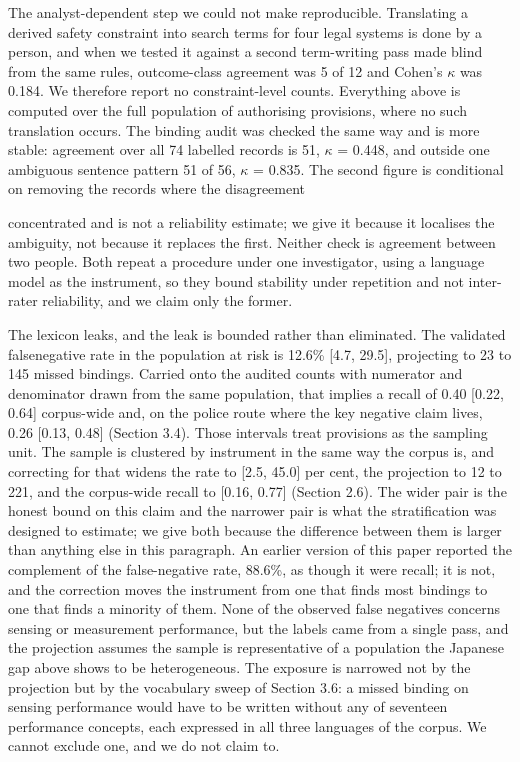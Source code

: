 The analyst-dependent step we could not make reproducible. Translating a derived safety constraint into search terms for four legal systems is done by a person, and when we tested it against a second term-writing pass made blind from the same rules, outcome-class agreement was 5 of 12 and Cohen's $\kappa$ was 0.184. We therefore report no constraint-level counts. Everything above is computed over the full population of authorising provisions, where no such translation occurs. The binding audit was checked the same way and is more stable: agreement over all 74 labelled records is 51, $\kappa$ = 0.448, and outside one ambiguous sentence pattern 51 of 56, $\kappa$ = 0.835. The second figure is conditional on removing the records where the disagreement

concentrated and is not a reliability estimate; we give it because it localises the ambiguity, not because it replaces the first. Neither check is agreement between two people. Both repeat a procedure under one investigator, using a language model as the instrument, so they bound stability under repetition and not inter-rater reliability, and we claim only the former.

The lexicon leaks, and the leak is bounded rather than eliminated. The validated falsenegative rate in the population at risk is 12.6\% [4.7, 29.5], projecting to 23 to 145 missed bindings. Carried onto the audited counts with numerator and denominator drawn from the same population, that implies a recall of 0.40 [0.22, 0.64] corpus-wide and, on the police route where the key negative claim lives, 0.26 [0.13, 0.48] (Section 3.4). Those intervals treat provisions as the sampling unit. The sample is clustered by instrument in the same way the corpus is, and correcting for that widens the rate to [2.5, 45.0] per cent, the projection to 12 to 221, and the corpus-wide recall to [0.16, 0.77] (Section 2.6). The wider pair is the honest bound on this claim and the narrower pair is what the stratification was designed to estimate; we give both because the difference between them is larger than anything else in this paragraph. An earlier version of this paper reported the complement of the false-negative rate, 88.6\%, as though it were recall; it is not, and the correction moves the instrument from one that finds most bindings to one that finds a minority of them. None of the observed false negatives concerns sensing or measurement performance, but the labels came from a single pass, and the projection assumes the sample is representative of a population the Japanese gap above shows to be heterogeneous. The exposure is narrowed not by the projection but by the vocabulary sweep of Section 3.6: a missed binding on sensing performance would have to be written without any of seventeen performance concepts, each expressed in all three languages of the corpus. We cannot exclude one, and we do not claim to.

